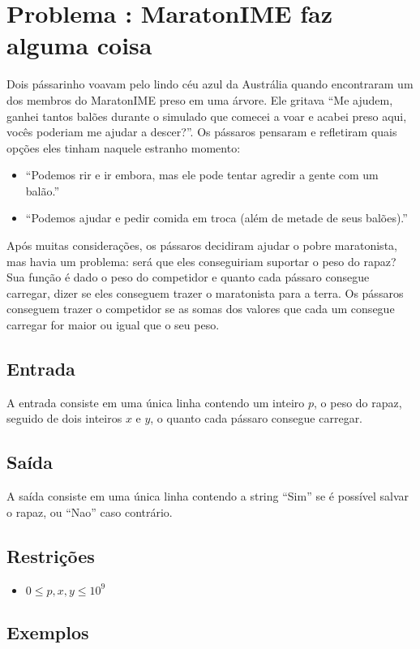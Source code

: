 \section*{Problema \proxLetra: MaratonIME faz alguma coisa}

Dois pássarinho voavam pelo lindo céu azul da Austrália quando encontraram um dos membros do MaratonIME preso em uma árvore. Ele gritava ``Me ajudem, ganhei tantos balões durante o simulado que comecei a voar e acabei preso aqui, vocês poderiam me ajudar a descer?''. Os pássaros pensaram e refletiram quais opções eles tinham naquele estranho momento:

\begin{itemize}
	\item ``Podemos rir e ir embora, mas ele pode tentar agredir a gente com um balão.''
	\item ``Podemos ajudar e pedir comida em troca (além de metade de seus balões).''
\end{itemize}

Após muitas considerações, os pássaros decidiram ajudar o pobre maratonista, mas havia um problema: será que eles conseguiriam suportar o peso do rapaz? Sua função é dado o peso do competidor e quanto cada pássaro consegue carregar, dizer se eles conseguem trazer o maratonista para a terra. Os pássaros conseguem trazer o competidor se as somas dos valores que cada um consegue carregar for maior ou igual que o seu peso. 


\subsection*{Entrada}
\textoDiversasInstanciasEOF

A entrada consiste em uma única linha contendo um inteiro $p$, o peso do rapaz, seguido de dois inteiros $x$ e $y$, o quanto cada pássaro consegue carregar.


\subsection*{Saída}

A saída consiste em uma única linha contendo a string ``Sim'' se é possível salvar o rapaz, ou ``Nao'' caso contrário.


\subsection*{Restrições}
\begin{itemize}
  \item $0 \leq p, x, y \leq 10^9$
\end{itemize}

\subsection*{Exemplos}

